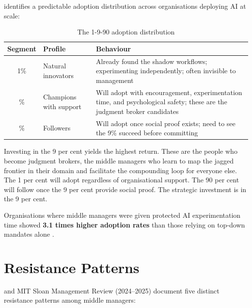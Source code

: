 \textcite{BCGAgenticShift2025} identifies a predictable adoption distribution across organisations deploying AI at scale:

\begin{table}[h]
\centering
\caption{The 1-9-90 adoption distribution}
\label{tab:adoption-distribution}
\begin{tabularx}{\textwidth}{c l X}
\toprule
\textbf{Segment} & \textbf{Profile} & \textbf{Behaviour} \\
\midrule
1\% & Natural innovators & Already found the shadow workflows; experimenting independently; often invisible to management \\
\addlinespace
9\% & Champions with support & Will adopt with encouragement, experimentation time, and psychological safety; these are the judgment broker candidates \\
\addlinespace
90\% & Followers & Will adopt once social proof exists; need to see the 9\% succeed before committing \\
\bottomrule
\end{tabularx}
\end{table}

Investing in the 9 per cent yields the highest return. These are the people who become judgment brokers, the middle managers who learn to map the jagged frontier in their domain and facilitate the compounding loop for everyone else. The 1 per cent will adopt regardless of organisational support. The 90 per cent will follow once the 9 per cent provide social proof. The strategic investment is in the 9 per cent.

\begin{evidencebox}
Organisations where middle managers were given protected AI experimentation time showed \textbf{3.1 times higher adoption rates} than those relying on top-down mandates alone \parencite{BCGAIKPIs2025}.
\end{evidencebox}

\section{Resistance Patterns}

\textcite{Capgemini2025} and MIT Sloan Management Review (2024--2025) document five distinct resistance patterns among middle managers:

